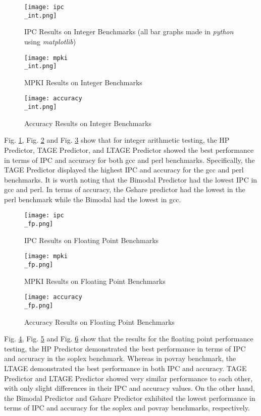 \documentclass[conference]{IEEEtran}
\begin{document}
\begin{figure}[htbp]
    \centering
    \texttt{[image: ipc\\\_int.png]}
    \caption{IPC Results on Integer Benchmarks (all bar graphs made in \textit{python} using \textit{matplotlib})}
    \label{fig:ipc_int}
\end{figure}

\begin{figure}[htbp]
    \centering
    \texttt{[image: mpki\\\_int.png]}
    \caption{MPKI Results on Integer Benchmarks}
    \label{fig:mpki_int}
\end{figure}

\begin{figure}[htbp]
    \centering
    \texttt{[image: accuracy\\\_int.png]}
    \caption{Accuracy Results on Integer Benchmarks}
    \label{fig:accuracy_int}
\end{figure}
\pagebreak
Fig. \ref{fig:ipc_int}, Fig. \ref{fig:mpki_int} and Fig. \ref{fig:accuracy_int} show that for integer arithmetic testing, the HP Predictor, TAGE Predictor, and LTAGE Predictor showed the best performance in terms of IPC and accuracy for both gcc and perl benchmarks. Specifically, the TAGE Predictor displayed the highest IPC and accuracy for the gcc and perl benchmarks. It is worth noting that the Bimodal Predictor had the lowest IPC in gcc and perl. In terms of accuracy, the Gshare predictor had the lowest in the perl benchmark while the Bimodal had the lowest in gcc.

\begin{figure}[htbp]
    \centering
    \texttt{[image: ipc\\\_fp.png]}
    \caption{IPC Results on Floating Point Benchmarks}
    \label{fig:ipc_fp}
\end{figure}

\begin{figure}[htbp]
    \centering
    \texttt{[image: mpki\\\_fp.png]}
    \caption{MPKI Results on Floating Point Benchmarks}
    \label{fig:mpki_fp}
\end{figure}

\begin{figure}[htbp]
    \centering
    \texttt{[image: accuracy\\\_fp.png]}
    \caption{Accuracy Results on Floating Point Benchmarks}
    \label{fig:accuracy_fp}
\end{figure}

Fig. \ref{fig:ipc_fp}, Fig. \ref{fig:mpki_fp} and Fig. \ref{fig:accuracy_fp} show that the results for the floating point performance testing, the HP Predictor demonstrated the best performance in terms of IPC and accuracy in the soplex benchmark. Whereas in povray benchmark, the LTAGE demonstrated the best performance in both IPC and accuracy. TAGE Predictor and LTAGE Predictor showed very similar performance to each other, with only slight differences in their IPC and accuracy values. On the other hand, the Bimodal Predictor and Gshare Predictor exhibited the lowest performance in terms of IPC and accuracy for the soplex and povray benchmarks, respectively.
\end{document}
